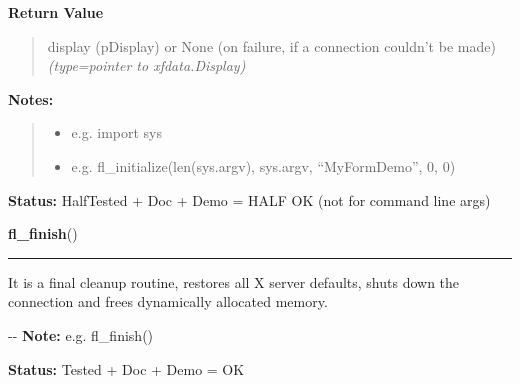 \begin{boxedminipage}{\funcwidth}
      \textbf{Return Value}
    \vspace{-1ex}

      \begin{quote}

display (pDisplay) or None (on failure, if a connection
couldn't be made)
      {\it (type=pointer to xfdata.Display)}

      \end{quote}

\textbf{Notes:}
\begin{quote}
  \begin{itemize}

  \item
    \setlength{\parskip}{0.6ex}

e.g. import sys


  \item 
e.g. fl\_initialize(len(sys.argv), sys.argv, ``MyFormDemo'', 0, 0)


\end{itemize}

\end{quote}

\textbf{Status:} 
HalfTested + Doc + Demo = HALF OK (not for command line args)


    \end{boxedminipage}

    \label{xformslib:flxbasic:fl_finish}

    \vspace{0.5ex}

\hspace{.8\funcindent}\begin{boxedminipage}{\funcwidth}

    \raggedright \textbf{fl\_finish}()

    \vspace{-1.5ex}

    \rule{\textwidth}{0.5\fboxrule}
\setlength{\parskip}{2ex}

It is a final cleanup routine, restores all X server defaults, shuts
down the connection and frees dynamically allocated memory.

-{}-
\setlength{\parskip}{1ex}
\textbf{Note:} 
e.g. fl\_finish()


\textbf{Status:} 
Tested + Doc + Demo = OK


    \end{boxedminipage}

